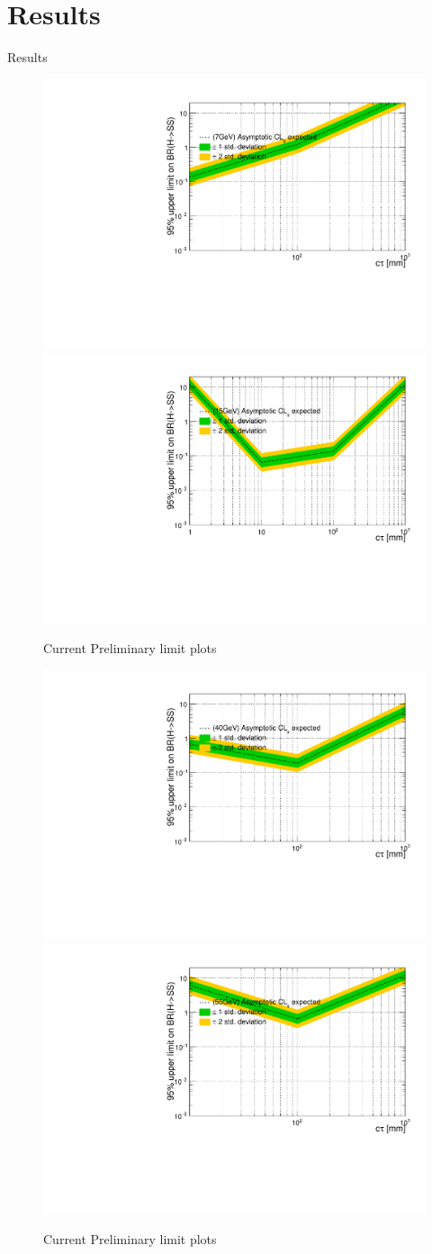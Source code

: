 \clearpage
\chapter{Results}\label{sec:results}
Results
 \begin{figure}[h!]
   \caption{Current Preliminary limit plots}
   \label{fig:Limit}
   \centering
   \includegraphics[width=0.47\linewidth]{figs/7GeVUpperLimit.pdf}
   \includegraphics[width=0.47\linewidth]{figs/15GeVUpperLimit.pdf}
 \end{figure}
 \begin{figure}[h!]
   \caption{Current Preliminary limit plots}
   \label{fig:Limit2}
   \centering
   \includegraphics[width=0.47\linewidth]{figs/40GeVUpperLimit.pdf}
   \includegraphics[width=0.47\linewidth]{figs/55GeVUpperLimit.pdf}
 \end{figure}
